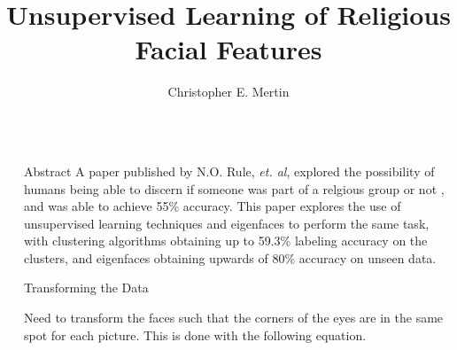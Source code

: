 \documentclass[final]{beamer}
\title{Unsupervised Learning of Religious Facial Features} %
\author{Christopher E. Mertin} %
\institute{School of Computing, University of Utah} %
\newlength{\sepwid}
\newlength{\onecolwid}
\begin{document}

\setlength{\belowcaptionskip}{2ex} %
\setlength\belowdisplayshortskip{2ex} %

\begin{frame}[t] %

\begin{columns}[t] %

\begin{column}{\sepwid}\end{column} %

\begin{column}{\onecolwid} %


\begin{alertblock}{Abstract}
A paper published by N.O. Rule, {\em et. al}, explored the possibility of humans being able to discern if someone was part of a relgious group or not \cite{MormonID}, and was able to achieve 55\% accuracy. This paper explores the use of unsupervised learning techniques and eigenfaces to perform the same task, with clustering algorithms obtaining up to 59.3\% labeling accuracy on the clusters, and eigenfaces obtaining upwards of 80\% accuracy on unseen data. 
\end{alertblock}


\begin{block}{Transforming the Data}

Need to transform the faces such that the corners of the eyes are in the same spot for each picture. This is done with the following equation.


\end{block}
\end{column}
\end{columns}
\end{frame}
\end{document}
